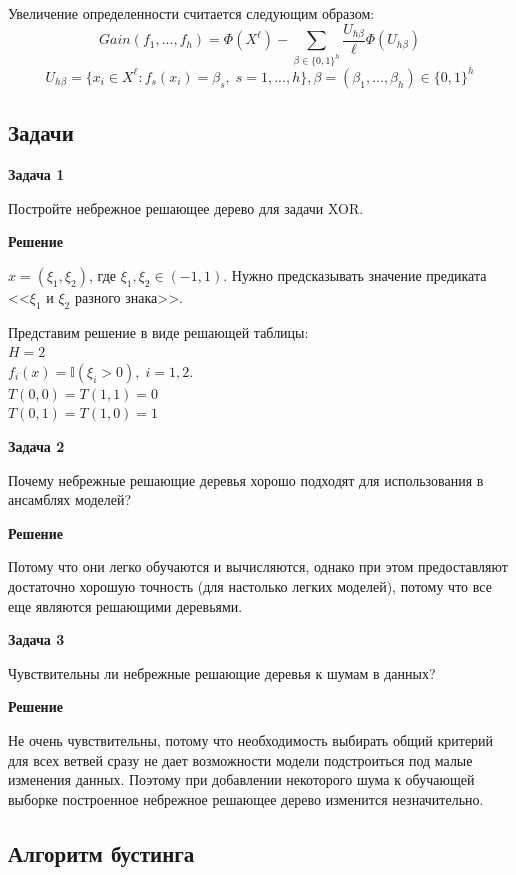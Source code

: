 Увеличение определенности считается следующим образом:
\begin{equation*}
    Gain(f_1, ..., f_h) = \Phi(X^{\ell}) - \sum\limits_{\beta\in \{0, 1\}^h}\frac{U_{h\beta}}{\ell}\Phi(U_{h\beta})
\end{equation*}
\begin{equation*}
    U_{h\beta} = \{x_i\in X^{\ell}: f_s(x_i)=\beta_s, \; s=1,...,h\}, \beta=(\beta_1, ...,\beta_h)\in\{0, 1\}^h
\end{equation*}

\subsection{Задачи}

\textbf{Задача 1}

Постройте небрежное решающее дерево для задачи XOR.

\textbf{Решение}

$ x = (\xi_1, \xi_2) $, где $ \xi_1, \xi_2\in(-1, 1) $.
Нужно предсказывать значение предиката <<$\xi_1$ и $\xi_2$ разного знака>>.

Представим решение в виде решающей таблицы: \\
$H = 2$ \\
$ f_i(x) = \mathbb{I}(\xi_i > 0), \; i = 1, 2 $. \\
$T(0, 0) = T(1, 1) = 0$ \\
$T(0, 1) = T(1, 0) = 1$

\textbf{Задача 2}

Почему небрежные решающие деревья хорошо подходят для использования в ансамблях моделей?

\textbf{Решение}

Потому что они легко обучаются и вычисляются,
однако при этом предоставляют достаточно хорошую точность (для настолько легких моделей), потому что все еще являются
решающими деревьями.

\textbf{Задача 3}

Чувствительны ли небрежные решающие деревья к шумам в данных?

\textbf{Решение}

Не очень чувствительны, потому что необходимость выбирать общий критерий для всех ветвей сразу не дает возможности
модели подстроиться под малые изменения данных. Поэтому при добавлении некоторого шума к обучающей выборке построенное
небрежное решающее дерево изменится незначительно.

\subsection*{Алгоритм бустинга}

